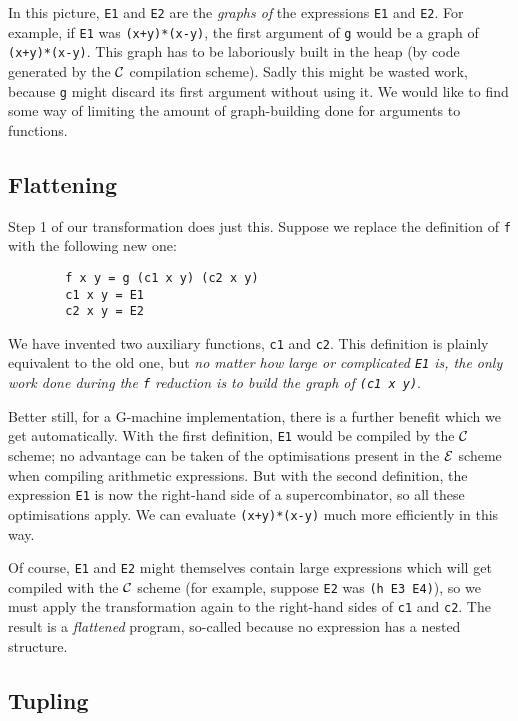 In this picture, \mbox{\tt E1} and \mbox{\tt E2} are the {\em graphs of\/}
the expressions \mbox{\tt E1} and \mbox{\tt E2}.  For example, if \mbox{\tt E1} was \mbox{\tt (x+y)*(x-y)}, the
first argument of \mbox{\tt g} would be a graph of \mbox{\tt (x+y)*(x-y)}.  This graph has to
be laboriously built in the heap (by code generated by
the ${\cal C}$ compilation scheme).
Sadly this might be wasted work, because
\mbox{\tt g} might discard its first argument without using it.
We would like to find some way of limiting the amount of graph-building
done for arguments to functions.

\subsection{Flattening}
\label{sect:tim:flatten}

Step 1 of our transformation does just this.  Suppose we replace the
definition of \mbox{\tt f} with the following new one:
\begin{verbatim}
        f x y = g (c1 x y) (c2 x y)
        c1 x y = E1
        c2 x y = E2
\end{verbatim}
We have invented two auxiliary functions, \mbox{\tt c1} and \mbox{\tt c2}.
This definition is plainly equivalent to the old one, but
{\em no matter how large or complicated \mbox{\tt E1} is, the only work done during
the \mbox{\tt f} reduction is to build the graph of \mbox{\tt (c1\ x\ y)}}.

Better still, for a G-machine implementation, there is a
further benefit which we get automatically.
With the first definition, \mbox{\tt E1} would be compiled by the ${\cal C}$
scheme; no advantage can be taken of the optimisations present in the
${\cal E}$ scheme when compiling arithmetic expressions.
But with the second definition, the expression \mbox{\tt E1} is now the right-hand
side of a supercombinator, so all these optimisations apply.
We can evaluate \mbox{\tt (x+y)*(x-y)} much more efficiently in this way.

Of course, \mbox{\tt E1} and \mbox{\tt E2} might themselves contain large expressions
which will get compiled with the ${\cal C}$ scheme (for example, suppose
\mbox{\tt E2} was \mbox{\tt (h\ E3\ E4)}), so we must apply the
transformation again to the right-hand sides of \mbox{\tt c1} and \mbox{\tt c2}.
The result is a {\em flattened\/} program, so-called because
no expression has a nested structure.

\subsection{Tupling}

